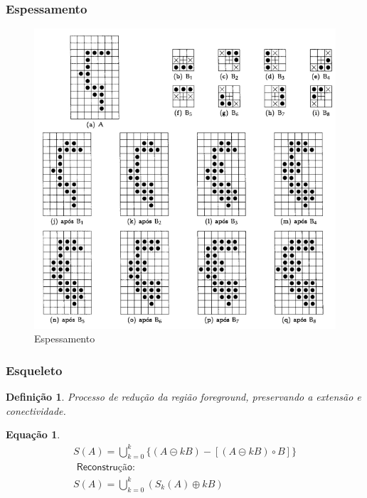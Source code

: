 \documentclass[aspectratio=169]{beamer}
\theoremstyle{Definition}
\newtheorem{defn}{Defini\c c\~ao}
\newtheorem{eq}[theorem]{Equa\c c\~ao}
\begin{document}
\begin{frame}
	\frametitle{Espessamento}
	
	\begin{figure}[h]
	 	\includegraphics[width=0.6\paperwidth,height=0.6\paperheight]{imagens/espessamento}
		\caption{Espessamento}\label{figLogical}
	\end{figure}
	
\end{frame}

\begin{frame}
	\frametitle{Esqueleto}
	
	\begin{defn}
		Processo de redução da região foreground, preservando a extensão e conectividade.
	\end{defn}
	
	\begin{eq}
		\begin{align*}
				S(A) = \bigcup^k_{k=0} \{ (A \circleddash kB) - [(A \circleddash kB) \circ B] \} \\
				\textsf{ Reconstrução}: \\
				S(A) = \bigcup^k_{k=0} (S_k(A) \oplus kB)
		\end{align*}
	
	\end{eq}
		
\end{frame}
\end{document}
